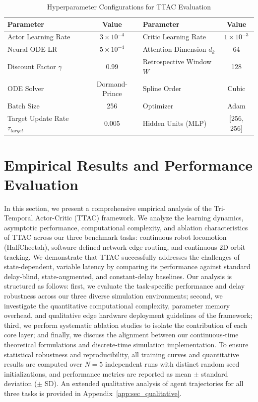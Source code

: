 \documentclass[manuscript, screen, review]{jair}
\begin{document}
\begin{table}[!htbp]
\centering
\caption{Hyperparameter Configurations for TTAC Evaluation}
\label{tab:hyperparams}
\vskip 0.1in
\begin{small}
\begin{tabular}{lc|lc}
\toprule
\textbf{Parameter} & \textbf{Value} & \textbf{Parameter} & \textbf{Value} \\
\midrule
Actor Learning Rate & $3 \times 10^{-4}$ & Critic Learning Rate & $1 \times 10^{-3}$ \\
Neural ODE LR & $5 \times 10^{-4}$ & Attention Dimension $d_k$ & 64 \\
Discount Factor $\gamma$ & 0.99 & Retrospective Window $W$ & 128 \\
ODE Solver & Dormand-Prince & Spline Order & Cubic \\
Batch Size & 256 & Optimizer & Adam \\
Target Update Rate $\tau_{target}$ & 0.005 & Hidden Units (MLP) & [256, 256] \\
\bottomrule
\end{tabular}
\end{small}
\end{table}

\section{Empirical Results and Performance Evaluation}\label{sec:results}
In this section, we present a comprehensive empirical analysis of the Tri-Temporal Actor-Critic (TTAC) framework. We analyze the learning dynamics, asymptotic performance, computational complexity, and ablation characteristics of TTAC across our three benchmark tasks: continuous robot locomotion (HalfCheetah), software-defined network edge routing, and continuous 2D orbit tracking. We demonstrate that TTAC successfully addresses the challenges of state-dependent, variable latency by comparing its performance against standard delay-blind, state-augmented, and constant-delay baselines. Our analysis is structured as follows: first, we evaluate the task-specific performance and delay robustness across our three diverse simulation environments; second, we investigate the quantitative computational complexity, parameter memory overhead, and qualitative edge hardware deployment guidelines of the framework; third, we perform systematic ablation studies to isolate the contribution of each core layer; and finally, we discuss the alignment between our continuous-time theoretical formulations and discrete-time simulation implementation. To ensure statistical robustness and reproducibility, all training curves and quantitative results are computed over $N=5$ independent runs with distinct random seed initializations, and performance metrics are reported as mean $\pm$ standard deviation ($\pm$ SD). An extended qualitative analysis of agent trajectories for all three tasks is provided in Appendix~\ref{app:sec_qualitative}.
\end{document}
